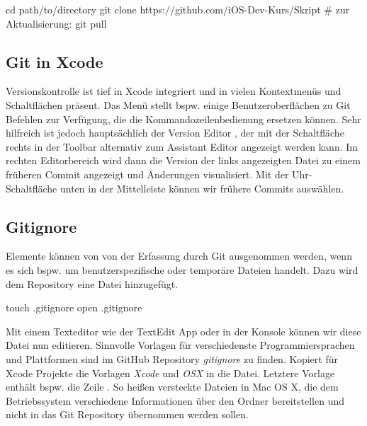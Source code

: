 \documentclass[parskip=half, final]{scrreprt}
\begin{document}
\begin{shlst}
cd path/to/directory
git clone https://github.com/iOS-Dev-Kurs/Skript
# zur Aktualisierung:
git pull
\end{shlst}


\subsection{Git in Xcode} 

Versionskontrolle ist tief in Xcode integriert und in vielen Kontextmenüs und Schaltflächen präsent. Das Menü  stellt bspw. einige Benutzeroberflächen zu Git Befehlen zur Verfügung, die die Kommandozeilenbedienung ersetzen können. Sehr hilfreich ist jedoch hauptsächlich der Version Editor , der mit der Schaltfläche rechts in der Toolbar alternativ zum Assistant Editor angezeigt werden kann. Im rechten Editorbereich wird dann die Version der links angezeigten Datei zu einem früheren Commit angezeigt und Änderungen visualisiert. Mit der Uhr-Schaltfläche unten in der Mittelleiste können wir frühere Commits auswählen.


\subsection{Gitignore}

Elemente können von von der Erfassung durch Git ausgenommen werden, wenn es sich bspw. um benutzerspezifische oder temporäre Dateien handelt. Dazu wird dem Repository eine  Datei hinzugefügt.

\begin{shlst}
touch .gitignore
open .gitignore
\end{shlst}

Mit einem Texteditor wie der TextEdit App oder  in der Konsole können wir diese Datei nun editieren. Sinnvolle Vorlagen für verschiedenste Programmiersprachen und Plattformen sind im GitHub Repository \emph{gitignore}  zu finden. Kopiert für Xcode Projekte die Vorlagen \emph{Xcode}  und \emph{OSX}  in die  Datei. Letztere Vorlage enthält bspw. die Zeile . So heißen versteckte Dateien in Mac OS X, die dem Betriebssystem verschiedene Informationen über den Ordner bereitstellen  und nicht in das Git Repository übernommen werden sollen.
\end{document}
